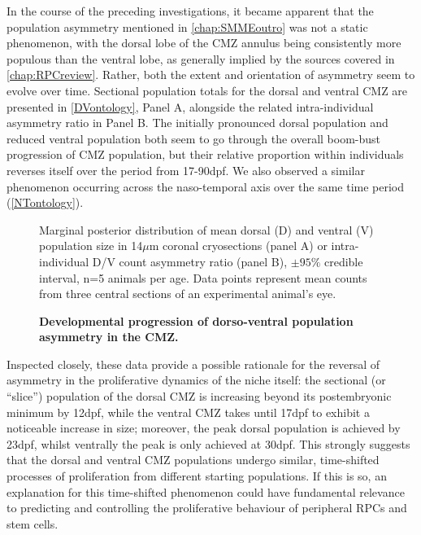 In the course of the preceding investigations, it became apparent that the population asymmetry mentioned in \autoref{chap:SMMEoutro} was not a static phenomenon, with the dorsal lobe of the CMZ annulus being consistently more populous than the ventral lobe, as generally implied by the sources covered in \autoref{chap:RPCreview}. Rather, both the extent and orientation of asymmetry seem to evolve over time. Sectional population totals for the dorsal and ventral CMZ are presented in \autoref{DVontology}, Panel A, alongside the related intra-individual asymmetry ratio in Panel B. The initially pronounced dorsal population and reduced ventral population both seem to go through the overall boom-bust progression of CMZ population, but their relative proportion within individuals reverses itself over the period from 17-90dpf. We also observed a similar phenomenon occurring across the naso-temporal axis over the same time period (\autoref{NTontology}).

\begin{figure}[!h]
    \caption{{\bf Developmental progression of dorso-ventral population asymmetry in the CMZ.}}
    Marginal posterior distribution of mean dorsal (D) and ventral (V) population size in 14$\mu$m coronal cryosections (panel A) or intra-individual D/V count asymmetry ratio (panel B), $\pm 95\%$ credible interval, n=5 animals per age. Data points represent mean counts from three central sections of an experimental animal's eye. 
    \label{DVontology}
\end{figure}

Inspected closely, these data provide a possible rationale for the reversal of asymmetry in the proliferative dynamics of the niche itself: the sectional (or ``slice'') population of the dorsal CMZ is increasing beyond its postembryonic minimum by 12dpf, while the ventral CMZ takes until 17dpf to exhibit a noticeable increase in size; moreover, the peak dorsal population is achieved by 23dpf, whilst ventrally the peak is only achieved at 30dpf. This strongly suggests that the dorsal and ventral CMZ populations undergo similar, time-shifted processes of proliferation from different starting populations. If this is so, an explanation for this time-shifted phenomenon could have fundamental relevance to predicting and controlling the proliferative behaviour of peripheral RPCs and stem cells.

